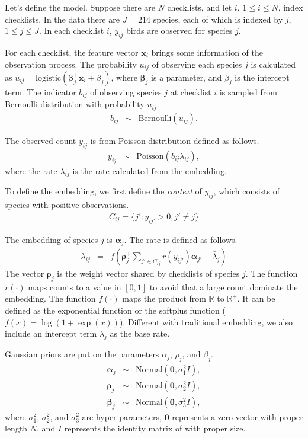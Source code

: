 \documentclass{article}
\newcommand{\wt}{\boldsymbol{\rho}}
\newcommand{\obswt}{\boldsymbol{\beta}}
\newcommand{\emb}{\boldsymbol{\alpha}}
\begin{document}
Let's define the model. Suppose there are $N$ checklists, and let $i$, $1 \le i \le N$, index checklists. In the data there are $J = 214$ species, each of which is indexed by $j$, $1 \le j \le J$.  
In each checklist $i$, $y_{ij}$ birds are observed for species $j$. 

For each checklist, the feature vector $\mathbf{x}_{i}$ brings some information of the observation process. The probability $u_{ij}$ of observing each species $j$ is calculated as $u_{ij} = \mathrm{logistic}(\obswt_j^\top \mathbf{x}_i + \bar{\beta}_j)$, where $\obswt_j$ is a parameter, and $\bar{\beta}_j$ is the intercept term. The indicator $b_{ij}$ of observing species $j$ at checklist $i$ is sampled from Bernoulli distribution with probability $u_{ij}$. 
\begin{eqnarray}
b_{ij} &\sim& \mathrm{Bernoulli}(u_{ij}).
\end{eqnarray}

The observed count $y_{ij}$ is from Poisson distribution defined as follows. 
\begin{eqnarray}
y_{ij} &\sim& \mathrm{Poisson}(b_{ij} \lambda_{ij}),
\end{eqnarray}
where the rate $\lambda_{ij}$ is the rate calculated from the embedding. 

To define the embedding, we first define the {\it context} of $y_{ij}$, which consists of species with positive observations. 
\begin{eqnarray}
C_{ij} = \{j': y_{ij'} > 0, j' \neq j\}
\end{eqnarray}

The embedding of species $j$ is $\emb_j$. The rate is defined as follows. 
\begin{eqnarray}
\lambda_{ij} &=& f\left(\wt_{j}^\top \sum_{j' \in C_{ij}} r(y_{ij'}) \emb_{j'} + \bar{\lambda}_{j} \right) \label{lambda_exp} 
\end{eqnarray}
The vector $\wt_j$ is the weight vector shared by checklists of species $j$. The function $r(\cdot)$ maps counts to a value in $[0, 1]$ to avoid that a large count dominate the embedding. The function $f(\cdot)$ maps the product from $\mathbb{R}$ to $\mathbb{R}^{+}$. It can be defined as the exponential function or the softplus function ($f(x) = \log(1 + \exp(x))$). Different with traditional embedding, we also include an intercept term $\bar{\lambda}_{j}$ as the base rate.

Gaussian priors are put on the parameters $\alpha_j$, $\rho_j$, and $\beta_j$. 
\begin{eqnarray}
\emb_j &\sim& \mathrm{Normal}(\mathbf{0}, \sigma^2_1 I), \\
\wt_j &\sim& \mathrm{Normal}(\mathbf{0}, \sigma^2_2 I), \\
\obswt_j &\sim& \mathrm{Normal}(\mathbf{0}, \sigma^2_3 I),
\end{eqnarray}
where $\sigma_1^2$, $\sigma_2^2$, and $\sigma_3^2$ are hyper-parameters, $\mathbf{0}$ represents a zero vector with proper length $N$, and $I$ represents the identity matrix of with proper size. 
\end{document}
